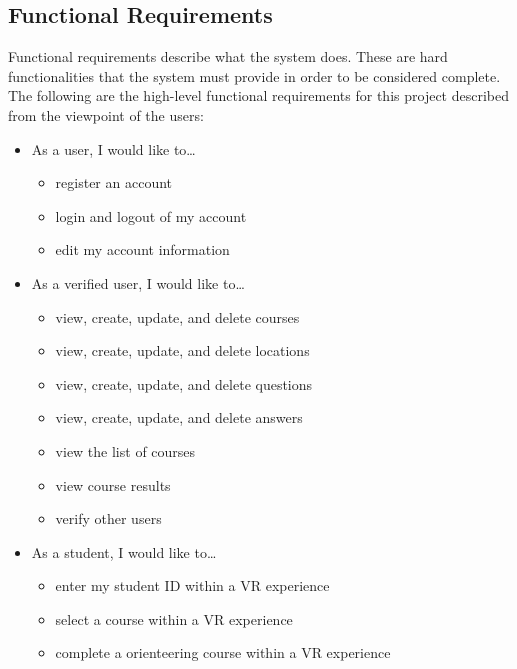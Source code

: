 \subsection{Functional Requirements}
Functional requirements describe what the system does. These are hard functionalities that the system must provide in order to be considered complete. The following are the high-level functional requirements for this project described from the viewpoint of the users:
\begin{itemize}
	\item As a user, I would like to\ldots
	\begin{itemize}
		\item register an account
		\item login and logout of my account
		\item edit my account information
	\end{itemize}
	\item As a verified user, I would like to\ldots
	\begin{itemize}
		\item view, create, update, and delete courses
		\item view, create, update, and delete locations
		\item view, create, update, and delete questions
		\item view, create, update, and delete answers
		\item view the list of courses
		\item view course results
		\item verify other users
	\end{itemize}
	\item As a student, I would like to\ldots
	\begin{itemize}
		\item enter my student ID  within a VR experience
		\item select a course within a VR experience
		\item complete a orienteering course within a VR experience
	\end{itemize}
\end{itemize}

